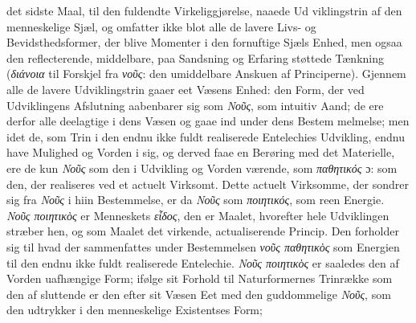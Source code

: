 \documentclass[12pt,a4paper]{book}
\newcommand{\gk}[1]{\textit{#1}}
\begin{document}
det sidste Maal, til den fuldendte Virkeliggjørelse, naaede Ud\-%
viklingstrin af den menneskelige Sjæl, og omfatter ikke blot
alle de lavere Livs- og Bevidsthedsformer, der blive Momenter
i den fornuftige Sjæls Enhed, men ogsaa den reflecterende,
middelbare, paa Sandsning og Erfaring støttede Tænkning
(\gk{διάνοια} til Forskjel fra \gk{νοῦς}: den umiddelbare Anskuen af
Principerne). Gjennem alle de lavere Udviklingstrin gaaer eet
Væsens Enhed: den Form, der ved Udviklingens Afslutning
aabenbarer sig som \gk{Νοῦς}, som intuitiv Aand; de ere derfor
alle deelagtige i dens Væsen og gaae ind under dens Bestem\-%
melmelse; men idet de, som Trin i den endnu ikke fuldt
realiserede Entelechies Udvikling, endnu have Mulighed og
Vorden i sig, og derved faae en Berøring med det Materielle,
ere de kun \gk{Νοῦς} som den i Udvikling og Vorden værende,
som \gk{παθητικός} ɔ: som den, der realiseres ved et actuelt
Virksomt. Dette actuelt Virksomme, der sondrer sig fra \gk{Νοῦς}
i hiin Bestemmelse, er da \gk{Νοῦς} som \gk{ποιητικός}, som reen
Energie. \gk{Νοῦς ποιητικὸς} er Menneskets \gk{εἶδος}, den er Maalet,
hvorefter hele Udviklingen stræber hen, og som Maalet det
virkende, actualiserende Princip. Den forholder sig til hvad
der sammenfattes under Bestemmelsen \gk{νοῦς παθητικὸς} som
Energien til den endnu ikke fuldt realiserede Entelechie.
\gk{Νοῦς ποιητικὸς} er saaledes den af Vorden uafhængige Form;
ifølge sit Forhold til Naturformernes Trinrække som den af\-%
sluttende er den efter sit Væsen Eet med den guddommelige
\gk{Νοῦς}, som den udtrykker i den menneskelige Existentses Form;
\end{document}
